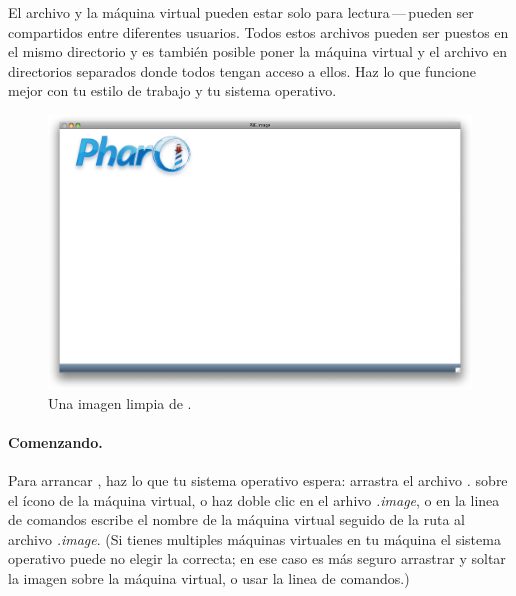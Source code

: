 \documentclass[a4paper,10pt,twoside]{book}
\begin{document}
El archivo  y la m\'aquina virtual pueden estar solo para lectura\,---\,pueden ser compartidos entre diferentes usuarios.
Todos estos archivos pueden ser puestos en el mismo directorio y es tambi\'en posible poner la m\'aquina virtual y el archivo  en directorios separados donde todos tengan acceso a ellos.
Haz lo que funcione mejor con tu estilo de trabajo y tu sistema operativo.


\begin{figure}[htb]
\centerline {\includegraphics[width=\textwidth]{startup}}
\caption{Una imagen limpia de \pbe.}
\end{figure}

\paragraph{Comenzando.} Para arrancar \pharo, haz lo que tu sistema operativo espera: arrastra el archivo \emph{.} sobre el \'icono de la m\'aquina virtual, o haz doble clic en el arhivo \emph{.image}, o en la linea de comandos escribe el nombre de la m\'aquina virtual seguido de la ruta al archivo \emph{.image}. (Si tienes multiples m\'aquinas virtuales en tu m\'aquina el sistema operativo puede no elegir la correcta; en ese caso es m\'as seguro arrastrar y soltar la imagen sobre la m\'aquina virtual, o usar la linea de comandos.)
\end{document}

